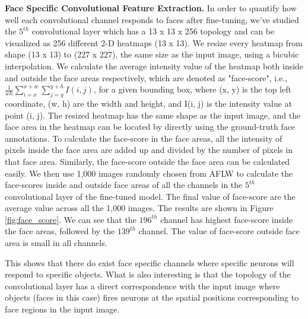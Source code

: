 \documentclass[10pt,twocolumn,letterpaper]{article}
\begin{document}
{\bf Face Specific Convolutional Feature Extraction.} In order to quantify how well each convolutional channel responds to faces after fine-tuning, we've studied the $5^{th}$ convolutional layer which has a 13 x 13 x 256 topology and can be visualized as 256 different 2-D heatmaps (13 x 13). We resize every heatmap from shape (13 x 13) to (227 x 227), the same size as the input image, using a bicubic interpolation. We calculate the average intensity value of the heatmap both inside and outside the face areas respectively, which are denoted as "face-score", i.e., $\frac{1}{wh}\sum_{i=x}^{x+w} \sum_{j=y}^{y+h} I(i, j)$, for a given bounding box, where (x, y) is the top left coordinate, (w, h) are the width and height, and I(i, j) is the intensity value at point (i, j). The resized heatmap has the same shape as the input image, and the face area in the heatmap can be located by directly using the ground-truth face annotations. To calculate the face-score in the face areas, all the intensity of pixels inside the face area are added up and divided by the number of pixels in that face area. Similarly, the face-score outside the face area can be calculated easily. We then use 1,000 images randomly chosen from AFLW \cite{kostinger2011annotated} to calculate the face-scores inside and outside face areas of all the channels in the $5^{th}$ convolutional layer of the fine-tuned model. The final value of face-score are the average value across all the 1,000 images. The results are shown in Figure \ref{fig:face_score}. We can see that the $196^{th}$ channel has highest face-score inside the face areas, followed by the $139^{th}$ channel. The value of face-score outside face area is small in all channels. 


This shows that there do exist face specific channels where specific neurons will respond to specific objects. What is also interesting is that the topology of the convolutional layer has a direct correspondence with the input image where objects (faces in this case) fires neurons at the spatial positions corresponding to face regions in the input image. 


\end{document}
